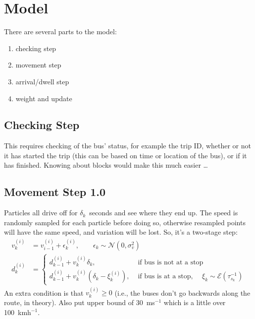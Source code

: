 \documentclass[10pt,a4paper]{article}
\begin{document}
\section{Model}

There are several parts to the model:

\begin{enumerate}
\item checking step
\item movement step
\item arrival/dwell step
\item weight and update
\end{enumerate}


\subsection{Checking Step}

This requires checking of the bus' status, for example the trip ID, whether or not it has started the trip
(this can be based on time or location of the bus), or if it has finished.
Knowing about blocks would make this much easier \ldots


\subsection{Movement Step 1.0}
\label{sec:move}

Particles all drive off for $\delta_k$~seconds and see where they end up.
The speed is randomly sampled for each particle before doing so, otherwise resampled points will have the same speed,
and variation will be lost.
So, it's a two-stage step:
\begin{align*}
  v_k^{(i)} &= v_{i-1}^{(i)} + \epsilon_{k}^{(i)},\qquad \epsilon_k \sim \mathcal{N}(0, \sigma_v^2) \\
  d_k^{(i)} &=
              \begin{cases}
                d_{k-1}^{(i)} + v_k^{(i)} \delta_k, & \text{ if bus is not at a stop } \\
                d_{k-1}^{(i)} + v_k^{(i)} \left(\delta_k - \xi_k^{(i)}\right),
                &\text{ if bus is at a stop, } \quad \xi_k \sim \mathcal{E}(\tau_{s_k}^{-1})
              \end{cases}
\end{align*}
An extra condition is that $v_k^{(i)} \geq 0$ (i.e., the buses don't go backwards along the route, in theory).
Also put upper bound of 30~ms$^{-1}$ which is a little over 100~kmh$^{-1}$.
\end{document}
